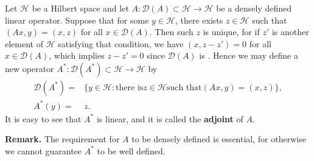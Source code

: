 \documentclass[12pt]{article}
\begin{document}
Let $\mathscr{H}$ be a Hilbert space and let $A\colon \mathscr{D}(A)\subset \mathscr{H}\to \mathscr{H}$ be a densely defined linear operator. Suppose that for some $y\in\mathscr{H}$, there exists
$z\in\mathscr{H}$ such that $(Ax,y) = (x,z)$ for all $x\in \mathscr{D}(A)$. Then such $z$ is unique, for if $z'$ is another element of $\mathscr{H}$ satisfying that condition, we have $(x,z-z') =  0$ for all $x\in \mathscr{D}(A)$, which implies $z-z'=0$ since $\mathscr{D}(A)$ is . Hence we may define a new operator $A^*:\mathscr{D}(A^*)\subset\mathscr{H}\to\mathscr{H}$ by 
\begin{align*}
\mathscr{D}(A^*) =& \{y\in \mathscr{H} : \text{there is} z\in \mathscr{H} \text{such that} (Ax,y) = (x,z)\},\\
A^*(y) =& z.
\end{align*}
It is easy to see that $A^*$ is linear, and it is called the \textbf{adjoint} of $A$.

\textbf{Remark.} The requirement for $A$ to be densely defined is essential, for otherwise we cannot guarantee $A^*$ to be well defined.
\end{document}
